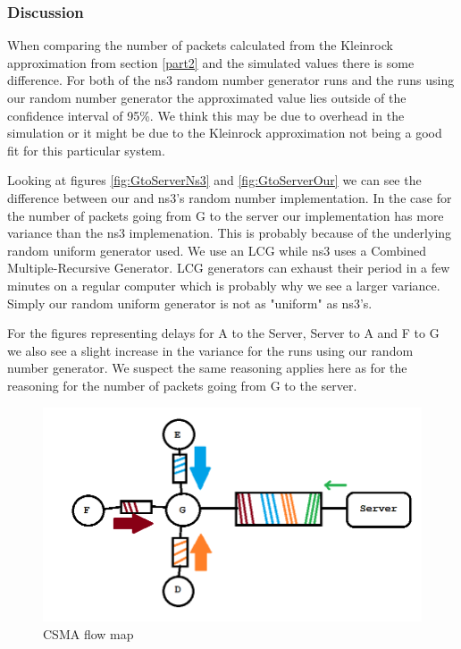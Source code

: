 \documentclass{article}
\begin{document}
\subsubsection{Discussion}
When comparing the number of packets calculated from the Kleinrock approximation from section \ref{part2} and the simulated values there is some difference.
For both of the ns3 random number generator runs and the runs using our random number generator the approximated value lies outside of the confidence interval of 95\%.
We think this may be due to overhead in the simulation or it might be due to the Kleinrock approximation not being a good fit for this particular system.

Looking at figures \ref{fig:GtoServerNs3} and \ref{fig:GtoServerOur} we can see the difference between our and ns3's random number implementation.
In the case for the number of packets going from G to the server our implementation has more variance than the ns3 implemenation.
This is probably because of the underlying random uniform generator used.
We use an LCG while ns3 uses a Combined Multiple-Recursive Generator.
LCG generators can exhaust their period in a few minutes on a regular computer \cite{l2002object} which is probably why we see a larger variance.
Simply our random uniform generator is not as "uniform" as ns3's.

For the figures representing delays for A to the Server, Server to A and F to G we also see a slight increase in the variance for the runs using our random number generator.
We suspect the same reasoning applies here as for the reasoning for the number of packets going from G to the server.

\begin{figure}[!htbp]
  \includegraphics[width=\linewidth]{csmamap.png}
  \caption{CSMA flow map}
  \label{fig:csma}
\end{figure}
\end{document}

